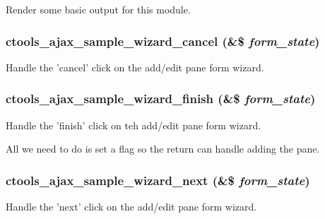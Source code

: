 Render some basic output for this module. \hypertarget{ctools__ajax__sample_8module_a8d0ff788c352e3f4e52127cde863e014}{
\subsubsection[{ctools\_\-ajax\_\-sample\_\-wizard\_\-cancel}]{\setlength{\rightskip}{0pt plus 5cm}ctools\_\-ajax\_\-sample\_\-wizard\_\-cancel (\&\$ {\em form\_\-state})}}
\label{ctools__ajax__sample_8module_a8d0ff788c352e3f4e52127cde863e014}
Handle the 'cancel' click on the add/edit pane form wizard. \hypertarget{ctools__ajax__sample_8module_a3db3671aee7a865c701ad8b842a6496f}{
\subsubsection[{ctools\_\-ajax\_\-sample\_\-wizard\_\-finish}]{\setlength{\rightskip}{0pt plus 5cm}ctools\_\-ajax\_\-sample\_\-wizard\_\-finish (\&\$ {\em form\_\-state})}}
\label{ctools__ajax__sample_8module_a3db3671aee7a865c701ad8b842a6496f}
Handle the 'finish' click on teh add/edit pane form wizard.

All we need to do is set a flag so the return can handle adding the pane. \hypertarget{ctools__ajax__sample_8module_a9a191fc7e9c9ba777975224408dfa8e1}{
\subsubsection[{ctools\_\-ajax\_\-sample\_\-wizard\_\-next}]{\setlength{\rightskip}{0pt plus 5cm}ctools\_\-ajax\_\-sample\_\-wizard\_\-next (\&\$ {\em form\_\-state})}}
\label{ctools__ajax__sample_8module_a9a191fc7e9c9ba777975224408dfa8e1}
Handle the 'next' click on the add/edit pane form wizard.


